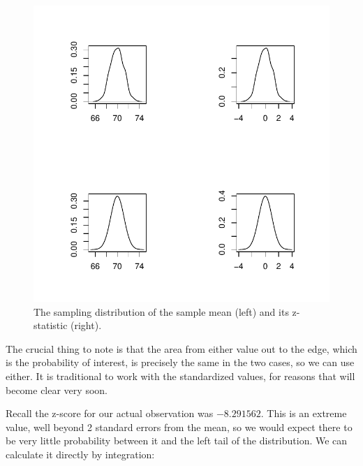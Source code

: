 \documentclass[12pt]{book}\usepackage[]{graphicx}\usepackage[]{color}
\makeatletter
\def\maxwidth{ %
  \ifdim\Gin@nat@width>\linewidth
    \linewidth
  \else
    \Gin@nat@width
  \fi
}
\newenvironment{knitrout}{}{} %
\makeatother
\begin{document}
\begin{figure}[!htbp]
  \centering
\begin{knitrout}
\color{fgcolor}
\includegraphics[width=\maxwidth]{figure/unnamed-chunk-43-1} 

\end{knitrout}
\caption{The sampling distribution of the sample mean (left) and its z-statistic (right).}
  \label{fig:sampleMeanVsZ}
\end{figure}

The crucial thing to note is that the area from either value out to the edge, which is the probability of interest, is precisely the same in the two cases, so we can use either. It is traditional to work with the standardized values, for reasons that will become clear very soon.

Recall the z-score for our actual observation was $-8.291562$. This is an extreme value, well beyond 2 standard errors 
from the mean, so we would expect there to be very little probability between it and the left tail of the distribution. We can calculate it directly by integration: 
\end{document}
